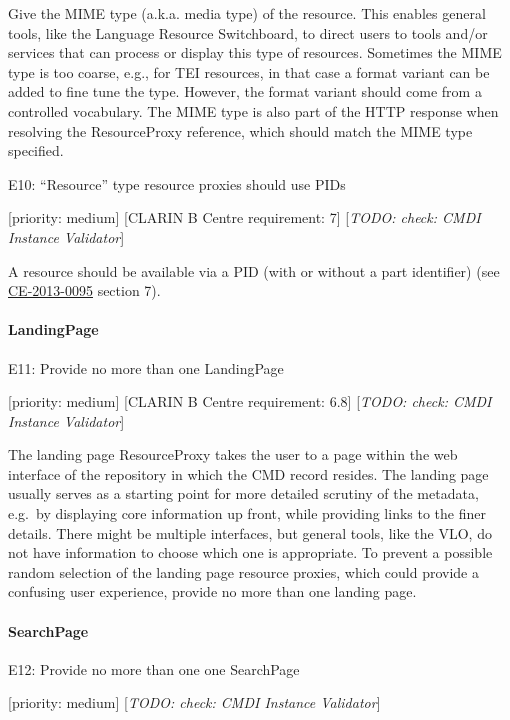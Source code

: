 \documentclass[]{article}
\let\oldparagraph\paragraph
\renewcommand{\paragraph}[1]{\oldparagraph{#1}\mbox{}}
\begin{document}
Give the MIME type (a.k.a. media type) of the resource. This enables
general tools, like the Language Resource Switchboard, to direct users
to tools and/or services that can process or display this type of
resources. Sometimes the MIME type is too coarse, e.g., for TEI
resources, in that case a format variant can be added to fine tune the
type. However, the format variant should come from a controlled
vocabulary. The MIME type is also part of the HTTP response when
resolving the ResourceProxy reference, which should match the MIME type
specified.

E10: ``Resource'' type resource proxies should use PIDs

{[}priority: medium{]} {[}CLARIN B Centre requirement: 7{]}
{[}\emph{TODO: check: CMDI Instance Validator}{]}

A resource should be available via a PID (with or without a part
identifier) (see
\href{http://hdl.handle.net/1839/00-DOCS.CLARIN.EU-78}{CE-2013-0095}
section 7).

\paragraph{LandingPage}\label{landingpage}

E11: Provide no more than one LandingPage

{[}priority: medium{]} {[}CLARIN B Centre requirement: 6.8{]}
{[}\emph{TODO: check: CMDI Instance Validator}{]}

The landing page ResourceProxy takes the user to a page within the web
interface of the repository in which the CMD record resides. The landing
page usually serves as a starting point for more detailed scrutiny of
the metadata, e.g.~by displaying core information up front, while
providing links to the finer details. There might be multiple
interfaces, but general tools, like the VLO, do not have information to
choose which one is appropriate. To prevent a possible random selection
of the landing page resource proxies, which could provide a confusing
user experience, provide no more than one landing page.

\paragraph{SearchPage}\label{searchpage}

E12: Provide no more than one one SearchPage

{[}priority: medium{]} {[}\emph{TODO: check: CMDI Instance Validator}{]}
\end{document}
